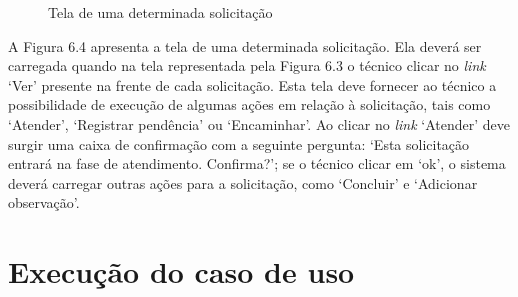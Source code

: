 \begin{figure}[ht]
    \centering
    \caption{Tela de uma determinada solicitação}
\end{figure}

A Figura 6.4 apresenta a tela de uma determinada solicitação. Ela deverá ser carregada quando na tela representada pela Figura 6.3 o técnico clicar no \textit{link} ‘Ver’ presente na frente de cada solicitação. Esta tela deve fornecer ao técnico a possibilidade de execução de algumas ações em relação à solicitação, tais como ‘Atender’, ‘Registrar pendência’ ou ‘Encaminhar’. Ao clicar no \textit{link} ‘Atender’ deve surgir uma caixa de confirmação com a seguinte pergunta: ‘Esta solicitação entrará na fase de atendimento. Confirma?’; se o técnico clicar em ‘ok’, o sistema deverá carregar outras ações para a solicitação, como ‘Concluir’ e ‘Adicionar observação’.

\section{Execução do caso de uso}

